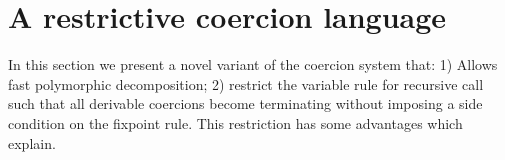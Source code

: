 \documentclass[a4paper,UKenglish,cleveref, autoref, thm-restate]{lipics-v2021}
\begin{document}
\section{A restrictive coercion language}
In this section we present a novel variant of the coercion system that: 1) Allows fast polymorphic decomposition; 2) restrict the variable rule for recursive call such that all derivable coercions become terminating without imposing a side condition on the fixpoint rule. This restriction has some advantages which explain.
\end{document}

